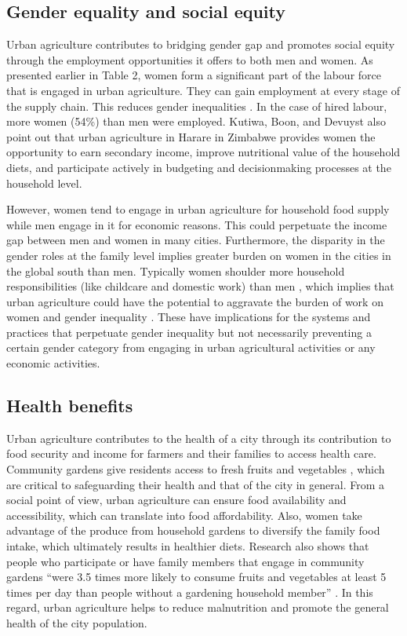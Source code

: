 \subsection{Gender equality and social equity}

Urban agriculture contributes to bridging gender gap and promotes social equity through the employment opportunities it offers to both men and women. As presented earlier in Table 2, women form a significant part of the labour force that is engaged in urban agriculture. They can gain employment at every stage of the supply chain. This reduces gender inequalities \cite{InternationalLabourOrganization2006}. In the case of hired labour, more women (54\%) than men were employed. Kutiwa, Boon, and Devuyst \cite{Kutiwa2010} also point out that urban agriculture in Harare in Zimbabwe provides women the opportunity to earn secondary income, improve nutritional value of the household diets, and participate actively in budgeting and decisionmaking processes at the household level.

However, women tend to engage in urban agriculture for household food supply while men engage in it for economic reasons. This could perpetuate the income gap between men and women in many cities. Furthermore, the disparity in the gender roles at the family level implies greater burden on women in the cities in the global south than men. Typically women shoulder more household responsibilities (like childcare and domestic work) than men \cite{Mencarini2012}, which implies that urban agriculture could have the potential to aggravate the burden of work on women and gender inequality \cite{Veenhuizen}. These have implications for the systems and practices that perpetuate gender inequality but not necessarily preventing a certain gender category from engaging in urban agricultural activities or any economic activities.

\subsection{Health benefits}

Urban agriculture contributes to the health of a city through its contribution to food security \cite{Opitz2016} and income for farmers and their families to access health care. Community gardens give residents access to fresh fruits and vegetables \cite{Larsen2009}, which are critical to safeguarding their health and that of the city in general. From a social point of view, urban agriculture can ensure food availability and accessibility, which can translate into food affordability. Also, women take advantage of the produce from household gardens to diversify the family food intake, which ultimately results in healthier diets. Research also shows that people who participate or have family members that engage in community gardens “were 3.5 times more likely to consume fruits and vegetables at least 5 times per day than people without a gardening household member” \cite{Alaimo2008}. In this regard, urban agriculture helps to reduce malnutrition and promote the general health of the city population.

